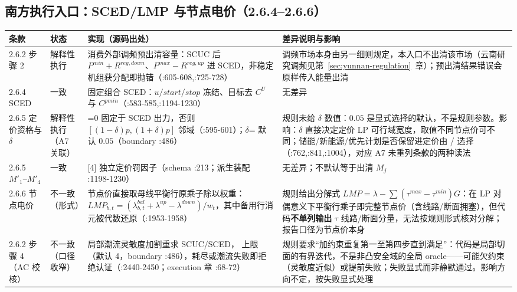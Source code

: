 \subsection{南方执行入口：SCED/LMP 与节点电价（2.6.4--2.6.6）}
\begin{center}\scriptsize
\begin{longtable}{@{}L{1.7cm}L{2.2cm}L{4.6cm}L{6.6cm}@{}}
\toprule 条款 & 状态 & 实现（源码出处） & 差异说明与影响\\\midrule
{}.2 步骤 2 & 解释性执行 & 消费外部调频预出清容量：SCUC 后 $P^{min}+R^{reg,down}$、$P^{max}-R^{reg,up}$ 进 SCED，非稳定机组获分配即抛错（:605-608,:725-728） & 调频市场本身由另一细则规定，本入口不出清该市场（云南研究调频见第~\ref{sec:yunnan-regulation}~章）；预出清结果错误会原样传入能量出清\\
2.6.4 SCED & 一致 & 固定组合 SCED：$u/start/stop$ 冻结、目标去 $C^U$ 与 $C^{pmin}$（:583-585,:1194-1230） & 无差异\\
2.6.5 定价资格与 $\delta$ & 解释性执行（A7 关联） & =0 固定于 SCED 出力，否则 $[(1-\delta)p,(1+\delta)p]$ 邻域（:595-601）；$\delta$= 默认 $0.05$（boundary :486） & 规则未给 $\delta$ 数值：$0.05$ 是显式选择的默认，不是规则参数。影响：$\delta$ 直接决定定价 LP 可行域宽度，取值不同节点价可不同；储能/新能源/优先计划是否保留进定价由 / 选择（:762,:841,:1004），对应 A7 未重列条款的两种读法\\
2.6.5 $M'_1$--$M'_4$ & 一致 & [4] 独立定价罚因子（schema :213；派生装配 :1198-1230） & 无差异；不默认等于出清 $M_j$\\
2.6.6 节点电价 & 不一致（形式） & 节点价直接取母线平衡行原乘子除以权重：$LMP_{b,t}=(\lambda^{bal}_{b,t}+\lambda^{up}-\lambda^{down})/w_t$，其中备用行消元被代数还原（:1953-1958） & 规则给出分解式 $LMP=\lambda-\sum(\tau^{max}-\tau^{min})G$：在 LP 对偶意义下平衡行乘子即完整节点价（含线路/断面拥塞），但代码\textbf{不单列输出} $\tau$ 线路/断面分量，无法按规则形式核对分解；报告口径为节点价本身\\
2.6.2 步骤 4（AC 校核） & 不一致（口径收窄） & 局部潮流灵敏度加割重求 SCUC/SCED， 上限（默认 4，boundary :486），耗尽或潮流失败即拒绝认证（:2440-2450；execution 章 :68-72） & 规则要求“加约束重复第一至第四步直到满足”：代码是局部切面的有界迭代，不是非凸安全域的全局 oracle——可能欠约束（灵敏度近似）或提前失败；失败显式而非静默通过。影响方向不定，按失败显式处理\\
\bottomrule
\end{longtable}
\end{center}

